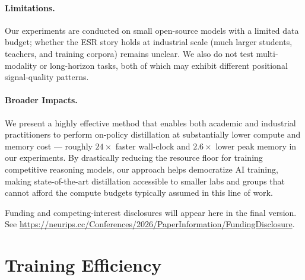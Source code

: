 \documentclass{article}
\newcommand{\method}{ESR}
\begin{document}
\paragraph{Limitations.} Our experiments are conducted on small open-source models with a limited data budget; whether the \method{} story holds at industrial scale (much larger students, teachers, and training corpora) remains unclear. We also do not test multi-modality or long-horizon tasks, both of which may exhibit different positional signal-quality patterns.

\paragraph{Broader Impacts.} We present a highly effective method that enables both academic and industrial practitioners to perform on-policy distillation at substantially lower compute and memory cost --- roughly $24\times$ faster wall-clock and $2.6\times$ lower peak memory in our experiments. By drastically reducing the resource floor for training competitive reasoning models, our approach helps democratize AI training, making state-of-the-art distillation accessible to smaller labs and groups that cannot afford the compute budgets typically assumed in this line of work.


\begin{ack}
Funding and competing-interest disclosures will appear here in the final
version. See \url{https://neurips.cc/Conferences/2026/PaperInformation/FundingDisclosure}.
\end{ack}






\appendix

\section{Training Efficiency}
\label{app:timing}
\end{document}
